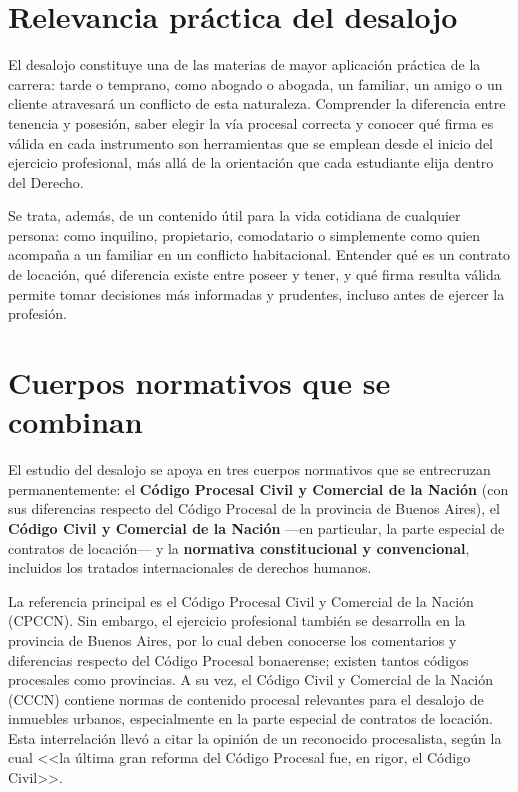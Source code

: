 \documentclass[12pt,oneside]{book}
\begin{document}
\section{Relevancia práctica del desalojo}

El desalojo constituye una de las materias de mayor aplicación práctica de la carrera: tarde o temprano, como abogado o abogada, un familiar, un amigo o un cliente atravesará un conflicto de esta naturaleza. Comprender la diferencia entre tenencia y posesión, saber elegir la vía procesal correcta y conocer qué firma es válida en cada instrumento son herramientas que se emplean desde el inicio del ejercicio profesional, más allá de la orientación que cada estudiante elija dentro del Derecho.

Se trata, además, de un contenido útil para la vida cotidiana de cualquier persona: como inquilino, propietario, comodatario o simplemente como quien acompaña a un familiar en un conflicto habitacional. Entender qué es un contrato de locación, qué diferencia existe entre poseer y tener, y qué firma resulta válida permite tomar decisiones más informadas y prudentes, incluso antes de ejercer la profesión.

\section{Cuerpos normativos que se combinan}

\begin{important}
El estudio del desalojo se apoya en tres cuerpos normativos que se entrecruzan permanentemente: el \textbf{Código Procesal Civil y Comercial de la Nación} (con sus diferencias respecto del Código Procesal de la provincia de Buenos Aires), el \textbf{Código Civil y Comercial de la Nación} ---en particular, la parte especial de contratos de locación--- y la \textbf{normativa constitucional y convencional}, incluidos los tratados internacionales de derechos humanos.
\end{important}

La referencia principal es el Código Procesal Civil y Comercial de la Nación (CPCCN). Sin embargo, el ejercicio profesional también se desarrolla en la provincia de Buenos Aires, por lo cual deben conocerse los comentarios y diferencias respecto del Código Procesal bonaerense; existen tantos códigos procesales como provincias. A su vez, el Código Civil y Comercial de la Nación (CCCN) contiene normas de contenido procesal relevantes para el desalojo de inmuebles urbanos, especialmente en la parte especial de contratos de locación. Esta interrelación llevó a citar la opinión de un reconocido procesalista, según la cual <<la última gran reforma del Código Procesal fue, en rigor, el Código Civil>>.
\end{document}
